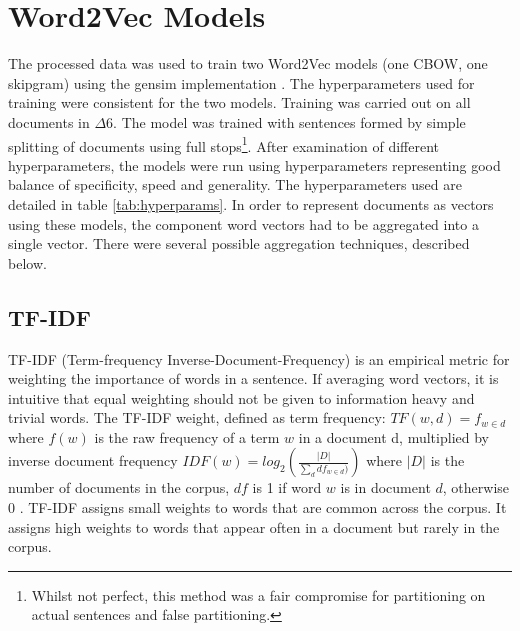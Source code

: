 \section{Word2Vec Models}
The processed data was used to train two Word2Vec models (one CBOW, one skipgram) using the gensim implementation \cite{gensim}. The hyperparameters used for training were consistent for the two models.
Training was carried out on all documents in $\Delta6$. The model was trained with sentences formed by simple splitting of documents using full stops\footnote{Whilst not perfect, this method was a fair compromise for partitioning on actual sentences and false partitioning.}. After examination of different hyperparameters, the models were run using hyperparameters representing good balance of specificity, speed and generality. The hyperparameters used are detailed in table \ref{tab:hyperparams}.
%
In order to represent documents as vectors using these models, the component word vectors had to be aggregated into a single vector. There were several possible aggregation techniques, described below.
\subsection{TF-IDF}
TF-IDF (Term-frequency Inverse-Document-Frequency) is an empirical metric for weighting the importance of words in a sentence. If averaging word vectors, it is intuitive that equal weighting should not be given to information heavy and trivial words. The TF-IDF weight, defined as term frequency: $TF \left( w , d \right) = f_{ w \in d }$ where $f\left( w \right)$ is the raw frequency of a term $w$ in a document d,
multiplied by inverse document frequency $IDF(w) = log_{2} \left( \frac{|D|}{\sum_d df_{w \in d})} \right)$ where $|D|$ is the number of documents in the corpus, $df$ is 1 if word $w$ is in document $d$, otherwise 0 \cite{gensim}.
TF-IDF assigns small weights to words that are common across the corpus. It assigns high weights to words that appear often in a document but rarely in the corpus.
